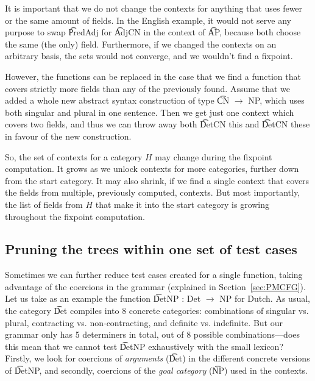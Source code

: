 It is important that we do not change the contexts for anything that
uses fewer or the same amount of fields. In the English example, it
would not serve any purpose to swap \t{PredAdj} for \t{AdjCN} in the
context of \t{AP}, because both choose the same (the only)
field. Furthermore, if we changed the contexts on an arbitrary basis,
the sets would not converge, and we wouldn't find a fixpoint.

However, the functions can be replaced in the case that we find a
function that covers strictly more fields than any of the previously found.
Assume that we added a whole new abstract syntax construction of type
\t{CN $\rightarrow$ NP}, which uses both singular and plural in one
sentence. Then we get just one context which covers two fields, and
thus we can throw away both \t{DetCN this} and \t{DetCN these} in
favour of the new construction.

So, the set of contexts for a category $H$ may change during the
fixpoint computation. It grows as we unlock contexts for more
categories, further down from the start category. It may also shrink,
if we find a single context that covers the fields from multiple,
previously computed, contexts. But most importantly, the list of
fields from $H$ that make it into the start category is growing
throughout the fixpoint computation.



\subsection{Pruning the trees within one set of test cases}


Sometimes we can further reduce test cases created for a single
function, taking advantage of the coercions in the grammar (explained
in Section~\ref{sec:PMCFG}).  Let us take as an example the function
\t{DetNP : Det $\rightarrow$ NP} for Dutch. As usual, the category
\t{Det} compiles into 8 concrete categories: combinations of singular
vs. plural, contracting vs.  non-contracting, and definite
vs. indefinite. But our grammar only has 5 determiners in total, out
of 8 possible combinations---does this mean that we cannot test
\t{DetNP} exhaustively with the small lexicon? Firstly, we look for
coercions of \emph{arguments} (\t{Det}) in the different concrete
versions of \t{DetNP}, and secondly, coercions of the \emph{goal
  category} (\t{NP}) used in the contexts.

